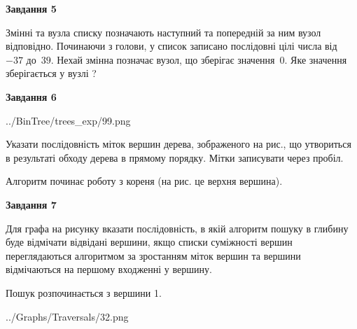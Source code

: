 \documentclass[12pt, ukrainian]{article}
\begin{document}
{\begin {large}
{\begin {center}\textbf{Завдання 5}\end {center}}\par
Змінні  та  вузла списку позначають наступний та попередній за ним вузол відповідно. Починаючи з голови, у список записано послідовні цілі числа від~$-37$ до~$39$. Нехай змінна  позначає вузол, що зберігає значення~$0$.
Яке значення зберігається у вузлі  ?\par
\newpage

{\begin {center}\textbf{Завдання 6}\end {center}}\par

\begin{center}
	{../BinTree/trees_exp/99.png}
\end{center}
Указати послідовність міток вершин дерева, зображеного на рис., що утвориться в результаті обходу дерева в прямому порядку. Мітки записувати через пробіл.\par Алгоритм починає роботу з кореня (на рис. це верхня вершина).\par
\newpage

{\begin {center}\textbf{Завдання 7}\end {center}}\par
Для графа на рисунку вказати послідовність, в якій алгоритм пошуку в глибину буде відмічати відвідані вершини, якщо списки суміжності вершин переглядаються алгоритмом за зростанням міток вершин та вершини відмічаються на першому вход\-женні у вершину.\par
Пошук розпочинається з вершини 1.\par

\begin{center}
	{../Graphs/Traversals/32.png}
\end{center}\par
\newpage


\end{large}}
\end{document}
